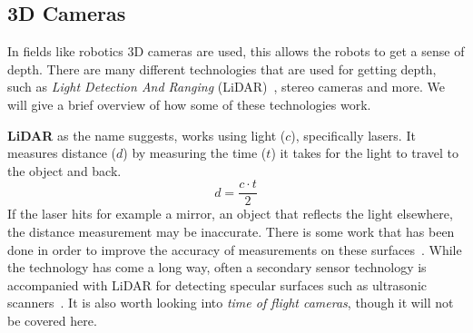 \begin{figure}
    \centering
    \qquad
    \caption{}
\end{figure}


\subsection{3D Cameras}\label{section:3Dcameras}
In fields like robotics 3D cameras are used, this allows the robots to get a
sense of depth. There are many different technologies that are used for getting
depth, such as \textit{Light Detection And Ranging}
(LiDAR)~\cite{henley23lidar}, stereo cameras and more. We will give a brief
overview of how some of these technologies work.

\textbf{LiDAR} as the name suggests, works using light ($c$), specifically
lasers. It measures distance ($d$) by measuring the time ($t$) it takes for the
light to travel to the object and back.
\[
    d = \frac{c \cdot t}{2}
\]
If the laser hits for example a mirror, an object that reflects the light
elsewhere, the distance measurement may be inaccurate. There is some work that
has been done in order to improve the accuracy of measurements on these
surfaces~\cite{foster2013visagge, henley23lidar}. While the technology has come
a long way, often a secondary sensor technology is accompanied with LiDAR for
detecting specular surfaces such as ultrasonic scanners~\cite{diosi2004advanced}.
It is also worth looking into \textit{time of flight cameras}\cite{hansard2012time}, though it will
not be covered here.

